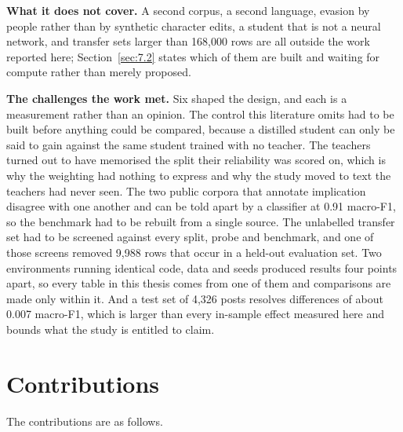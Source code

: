 \textbf{What it does not cover.} A second corpus, a second language, evasion by people rather than by
synthetic character edits, a student that is not a neural network, and transfer sets larger than
168,000 rows are all outside the work reported here; Section~\ref{sec:7.2} states which of them are
built and waiting for compute rather than merely proposed.

\textbf{The challenges the work met.} Six shaped the design, and each is a measurement rather than an
opinion. The control this literature omits had to be built before anything could be compared, because
a distilled student can only be said to gain against the same student trained with no teacher. The
teachers turned out to have memorised the split their reliability was scored on, which is why the
weighting had nothing to express and why the study moved to text the teachers had never seen. The two
public corpora that annotate implication disagree with one another and can be told apart by a
classifier at 0.91 macro-F1, so the benchmark had to be rebuilt from a single source. The unlabelled
transfer set had to be screened against every split, probe and benchmark, and one of those screens
removed 9,988 rows that occur in a held-out evaluation set. Two environments running identical code,
data and seeds produced results four points apart, so every table in this thesis comes from one of
them and comparisons are made only within it. And a test set of 4,326 posts resolves differences of
about 0.007 macro-F1, which is larger than every in-sample effect measured here and bounds what the
study is entitled to claim.

\section{Contributions}
\label{sec:1.6}
The contributions are as follows.

